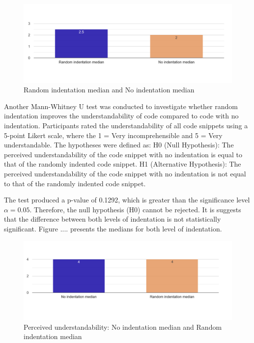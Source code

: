 \begin{figure} [H]
  \centering
  \includegraphics[scale=0.4]{figures/r-0-q5.png}
  \caption{ Random indentation median and No indentation median}
  \label{fig:AnhangsChor}
\end{figure}


Another Mann-Whitney U test was conducted to investigate whether random indentation improves the understandability of code compared to code with no indentation. Participants rated the understandability of all code snippets using a 5-point Likert scale, where the 1 =  Very incomprehensible and 5 = Very understandable.  The hypotheses were defined as: H0 (Null Hypothesis): The perceived understandability of the code snippet with no indentation is equal to that of the randomly indented code snippet. H1 (Alternative Hypothesis): The perceived understandability of the code snippet with no indentation is not equal to that of the randomly indented code snippet.

The test produced a p-value of 0.1292, which is greater than the significance level \(\alpha = 0.05\). Therefore, the null hypothesis (H0) cannot be rejected. It is suggests that the difference between both levels of indentation is not statistically significant. Figure .... presents the medians for both level of indentation.

\begin{figure} [H]
  \centering
  \includegraphics[scale=0.4]{figures/0-r-q3.png}
  \caption{ Perceived understandability: No indentation median and Random indentation median}
  \label{fig:AnhangsChor}
\end{figure}




